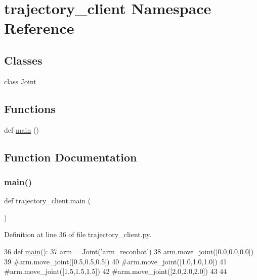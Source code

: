 \hypertarget{namespacetrajectory__client}{}\section{trajectory\+\_\+client Namespace Reference}
\label{namespacetrajectory__client}
\subsection*{Classes}
\begin{DoxyCompactItemize}
\item 
class \hyperlink{classtrajectory__client_1_1_joint}{Joint}
\end{DoxyCompactItemize}
\subsection*{Functions}
\begin{DoxyCompactItemize}
\item 
def \hyperlink{namespacetrajectory__client_a02f1f1cd99c608b8ea5167cb3c52a485}{main} ()
\end{DoxyCompactItemize}


\subsection{Function Documentation}
\mbox{\label{namespacetrajectory__client_a02f1f1cd99c608b8ea5167cb3c52a485}} 
\subsubsection{\texorpdfstring{main()}{main()}}
{\footnotesize\ttfamily def trajectory\+\_\+client.\+main (\begin{DoxyParamCaption}{ }\end{DoxyParamCaption})}



Definition at line 36 of file trajectory\+\_\+client.\+py.


\begin{DoxyCode}
36 \textcolor{keyword}{def }\hyperlink{namespacetrajectory__client_a02f1f1cd99c608b8ea5167cb3c52a485}{main}():
37             arm = Joint(\textcolor{stringliteral}{'arm\_reconbot'})
38             arm.move\_joint([0.0,0.0,0.0])
39             \textcolor{comment}{#arm.move\_joint([0.5,0.5,0.5])}
40             \textcolor{comment}{#arm.move\_joint([1.0,1.0,1.0])}
41             \textcolor{comment}{#arm.move\_joint([1.5,1.5,1.5])}
42             \textcolor{comment}{#arm.move\_joint([2.0,2.0,2.0])}
43 
44 
\end{DoxyCode}
